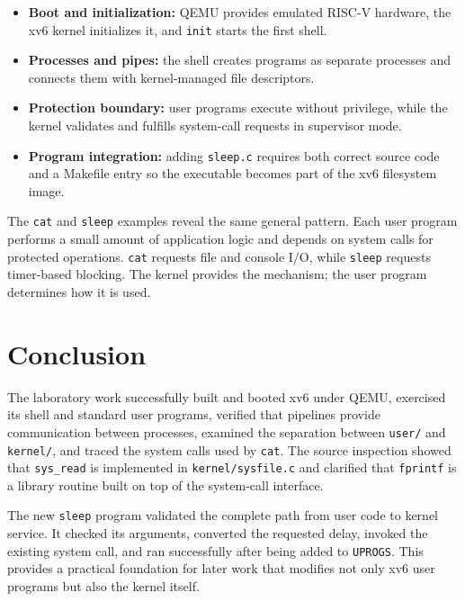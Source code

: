 \documentclass[12pt]{article}
\newcommand{\commandname}[1]{\texttt{#1}}
\begin{document}
\begin{itemize}
    \item \textbf{Boot and initialization:} QEMU provides emulated RISC-V hardware, the xv6 kernel initializes it, and \commandname{init} starts the first shell.
    \item \textbf{Processes and pipes:} the shell creates programs as separate processes and connects them with kernel-managed file descriptors.
    \item \textbf{Protection boundary:} user programs execute without privilege, while the kernel validates and fulfills system-call requests in supervisor mode.
    \item \textbf{Program integration:} adding \commandname{sleep.c} requires both correct source code and a Makefile entry so the executable becomes part of the xv6 filesystem image.
\end{itemize}

The \commandname{cat} and \commandname{sleep} examples reveal the same general pattern. Each user program performs a small amount of application logic and depends on system calls for protected operations. \commandname{cat} requests file and console I/O, while \commandname{sleep} requests timer-based blocking. The kernel provides the mechanism; the user program determines how it is used.

\section{Conclusion}

The laboratory work successfully built and booted xv6 under QEMU, exercised its shell and standard user programs, verified that pipelines provide communication between processes, examined the separation between \commandname{user/} and \commandname{kernel/}, and traced the system calls used by \commandname{cat}. The source inspection showed that \commandname{sys\_read} is implemented in \commandname{kernel/sysfile.c} and clarified that \commandname{fprintf} is a library routine built on top of the system-call interface.

The new \commandname{sleep} program validated the complete path from user code to kernel service. It checked its arguments, converted the requested delay, invoked the existing system call, and ran successfully after being added to \commandname{UPROGS}. This provides a practical foundation for later work that modifies not only xv6 user programs but also the kernel itself.
\end{document}
